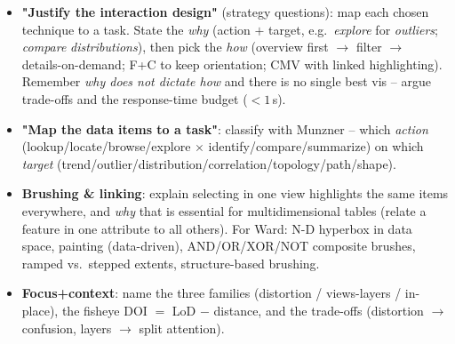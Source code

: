 \begin{exambox}
\begin{itemize}
  \item \textbf{"Justify the interaction design"} (strategy questions): map each chosen technique to a task. State the \emph{why} (action $+$ target, e.g.\ \emph{explore} for \emph{outliers}; \emph{compare} \emph{distributions}), then pick the \emph{how} (overview first $\to$ filter $\to$ details-on-demand; F+C to keep orientation; CMV with linked highlighting). Remember \emph{why does not dictate how} and there is no single best vis -- argue trade-offs and the response-time budget ($<1$\,s).
  \item \textbf{"Map the data items to a task"}: classify with Munzner -- which \emph{action} (lookup/locate/browse/explore $\times$ identify/compare/summarize) on which \emph{target} (trend/outlier/distribution/correlation/topology/path/shape).
  \item \textbf{Brushing \& linking}: explain selecting in one view highlights the same items everywhere, and \emph{why} that is essential for multidimensional tables (relate a feature in one attribute to all others). For Ward: N-D hyperbox in data space, painting (data-driven), AND/OR/XOR/NOT composite brushes, ramped vs.\ stepped extents, structure-based brushing.
  \item \textbf{Focus+context}: name the three families (distortion / views-layers / in-place), the fisheye DOI $=$ LoD $-$ distance, and the trade-offs (distortion $\to$ confusion, layers $\to$ split attention).
\end{itemize}
\end{exambox}
